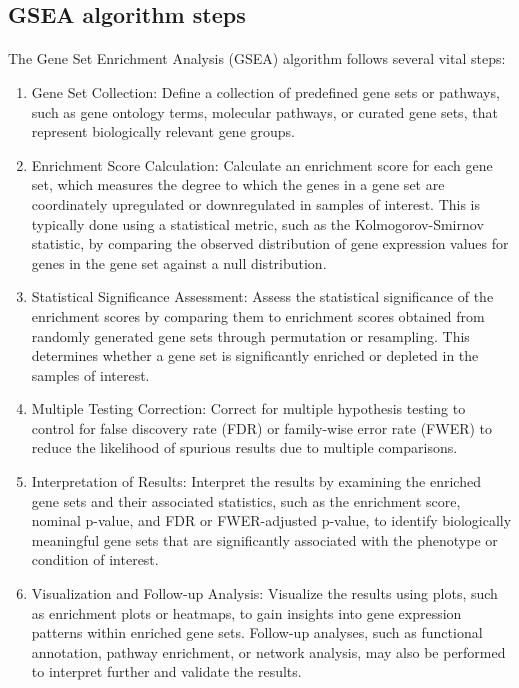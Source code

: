 \documentclass[12pt]{extarticle}
\begin{document}
\subsection{GSEA algorithm steps}

\paragraph{} The Gene Set Enrichment Analysis (GSEA) algorithm follows several vital steps:

\begin{enumerate}
    \item Gene Set Collection: Define a collection of predefined gene sets or pathways, such as gene ontology terms, molecular pathways, or curated gene sets, that represent biologically relevant gene groups.

    \item Enrichment Score Calculation: Calculate an enrichment score for each gene set, which measures the degree to which the genes in a gene set are coordinately upregulated or downregulated in samples of interest. This is typically done using a statistical metric, such as the Kolmogorov-Smirnov statistic, by comparing the observed distribution of gene expression values for genes in the gene set against a null distribution.

    \item Statistical Significance Assessment: Assess the statistical significance of the enrichment scores by comparing them to enrichment scores obtained from randomly generated gene sets through permutation or resampling. This determines whether a gene set is significantly enriched or depleted in the samples of interest.

    \item Multiple Testing Correction: Correct for multiple hypothesis testing to control for false discovery rate (FDR) or family-wise error rate (FWER) to reduce the likelihood of spurious results due to multiple comparisons.

    \item Interpretation of Results: Interpret the results by examining the enriched gene sets and their associated statistics, such as the enrichment score, nominal p-value, and FDR or FWER-adjusted p-value, to identify biologically meaningful gene sets that are significantly associated with the phenotype or condition of interest.

    \item Visualization and Follow-up Analysis: Visualize the results using plots, such as enrichment plots or heatmaps, to gain insights into gene expression patterns within enriched gene sets. Follow-up analyses, such as functional annotation, pathway enrichment, or network analysis, may also be performed to interpret further and validate the results.
\end{enumerate}
\end{document}
